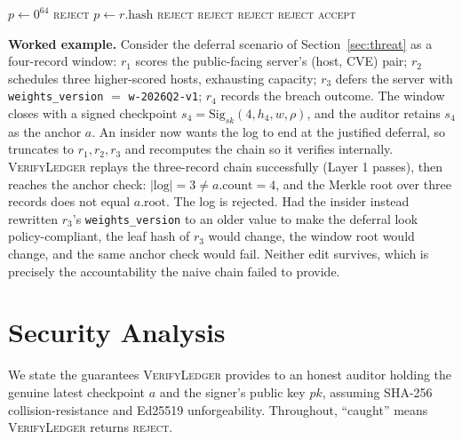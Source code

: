 \documentclass[journal]{IEEEtran}
\begin{document}
\begin{algorithm}[!t]
\caption{VerifyLedger$(\text{log},\ \text{checkpoints},\ a,\ pk)$}
\label{alg:verify}
\begin{algorithmic}[1]
\State $p \gets 0^{64}$
                                  
    \State \Return \textsc{reject}
  \EndIf
  \State $p \gets r.\text{hash}$
\EndFor
{} \Return \textsc{reject} \EndIf {}
  \State \Return \textsc{reject}                       
\EndIf
{} \Return \textsc{reject} \EndIf
{}               
    \State \Return \textsc{reject}
  \EndIf
\EndFor
\State \Return \textsc{accept}
\end{algorithmic}
\end{algorithm}

\textbf{Worked example.} Consider the deferral scenario of
Section~\ref{sec:threat} as a four-record window: $r_1$ scores the
public-facing server's (host, CVE) pair; $r_2$ schedules three higher-scored
hosts, exhausting capacity; $r_3$ defers the server with
\texttt{weights\_version} $=$ \texttt{w-2026Q2-v1}; $r_4$ records the breach
outcome. The window closes with a signed checkpoint $s_4 =
\mathrm{Sig}_{sk}(4, h_4, w, \rho)$, and the auditor retains $s_4$ as the
anchor $a$. An insider now wants the log to end at the justified deferral, so
truncates to $r_1,r_2,r_3$ and recomputes the chain so it verifies internally.
\textsc{VerifyLedger} replays the three-record chain successfully (Layer 1
passes), then reaches the anchor check: $|\text{log}|=3 \neq a.\text{count}=4$,
and the Merkle root over three records does not equal $a.\text{root}$. The log
is rejected. Had the insider instead rewritten $r_3$'s \texttt{weights\_version}
to an older value to make the deferral look policy-compliant, the leaf hash of
$r_3$ would change, the window root would change, and the same anchor check
would fail. Neither edit survives, which is precisely the accountability the
naive chain failed to provide.

\section{Security Analysis}
\label{sec:analysis}
We state the guarantees \textsc{VerifyLedger} provides to an honest auditor
holding the genuine latest checkpoint $a$ and the signer's public key $pk$,
assuming SHA-256 collision-resistance and Ed25519 unforgeability. Throughout,
``caught'' means \textsc{VerifyLedger} returns \textsc{reject}.
\end{document}
